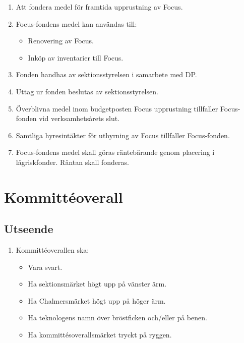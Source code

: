 \documentclass[11pt,a4paper]{article}
\begin{document}
\begin{enumerate}[\thesubsection .1]

  \item Att fondera medel för framtida upprustning av Focus.

  \item Focus-fondens medel kan användas till:
    \begin{itemize}
      \item Renovering av Focus.
      \item Inköp av inventarier till Focus.
    \end{itemize}

  \item Fonden handhas av sektionsstyrelsen i samarbete med DP.

  \item Uttag ur fonden beslutas av sektionsstyrelsen.

  \item Överblivna medel inom budgetposten Focus upprustning tillfaller Focus-fonden vid verksamhetsårets slut.
  
  \item Samtliga hyresintäkter för uthyrning av Focus tillfaller Focus-fonden.

  \item Focus-fondens medel skall göras räntebärande genom placering i
  låg\-risk\-fond\-er. Räntan skall fonderas.

\end{enumerate}

\section{Kommittéoverall}

\subsection{Utseende}

\begin{enumerate}[\thesubsection .1]
  \item Kommittéoverallen ska:
    \begin{itemize}
      \item Vara svart.
      \item Ha sektionsmärket högt upp på vänster ärm.
      \item Ha Chalmersmärket högt upp på höger ärm.
      \item Ha teknologens namn över bröstficken och/eller på benen.
      \item Ha kommittésoverallsmärket tryckt på ryggen.
    \end{itemize}
\end{enumerate}
\end{document}
